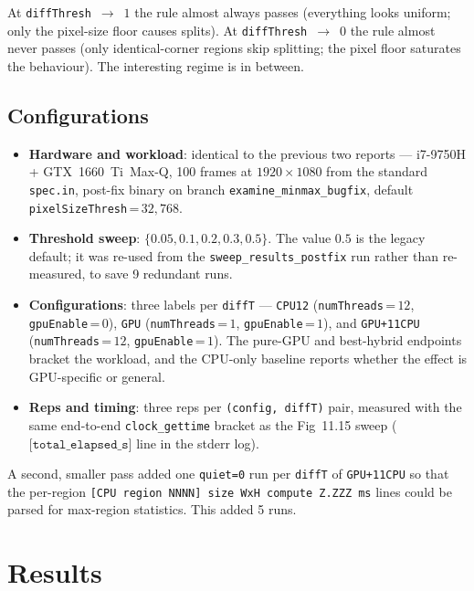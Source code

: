 \documentclass[
	english,
	letterpaper, oneside
]{article}
\begin{document}
\noindent
At \texttt{diffThresh}~$\to$~$1$ the rule almost always passes
(everything looks uniform; only the pixel-size floor causes splits).
At \texttt{diffThresh}~$\to$~$0$ the rule almost never passes (only
identical-corner regions skip splitting; the pixel floor saturates the
behaviour). The interesting regime is in between.

\subsection{Configurations}

\begin{itemize}
    \item \textbf{Hardware and workload}: identical to the previous two
    reports --- i7-9750H + GTX~1660~Ti~Max-Q, 100 frames at
    $1920\times1080$ from the standard \texttt{spec.in}, post-fix
    binary on branch \texttt{examine\_minmax\_bugfix}, default
    \texttt{pixelSizeThresh}\,=\,$32{,}768$.
    \item \textbf{Threshold sweep}: $\{0.05, 0.1, 0.2, 0.3, 0.5\}$.
    The value $0.5$ is the legacy default; it was re-used from the
    \texttt{sweep\_results\_postfix} run rather than re-measured, to
    save 9 redundant runs.
    \item \textbf{Configurations}: three labels per \texttt{diffT} ---
    \texttt{CPU12} (\texttt{numThreads}\,=\,$12$, \texttt{gpuEnable}\,=\,$0$),
    \texttt{GPU} (\texttt{numThreads}\,=\,$1$, \texttt{gpuEnable}\,=\,$1$),
    and \texttt{GPU+11CPU} (\texttt{numThreads}\,=\,$12$, \texttt{gpuEnable}\,=\,$1$).
    The pure-GPU and best-hybrid endpoints bracket the workload, and
    the CPU-only baseline reports whether the effect is GPU-specific
    or general.
    \item \textbf{Reps and timing}: three reps per \texttt{(config, diffT)}
    pair, measured with the same end-to-end \texttt{clock\_gettime}
    bracket as the Fig~11.15 sweep ($\texttt{[total\_elapsed\_s]}$ line
    in the stderr log).
\end{itemize}

\noindent
A second, smaller pass added one \texttt{quiet=0} run per
\texttt{diffT} of \texttt{GPU+11CPU} so that the per-region
\texttt{[CPU region NNNN] size WxH compute Z.ZZZ ms} lines could be
parsed for max-region statistics. This added 5 runs.

\section{Results}
\end{document}
